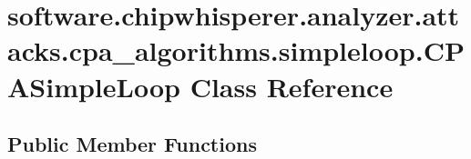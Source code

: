\hypertarget{classsoftware_1_1chipwhisperer_1_1analyzer_1_1attacks_1_1cpa__algorithms_1_1simpleloop_1_1CPASimpleLoop}{}\section{software.\+chipwhisperer.\+analyzer.\+attacks.\+cpa\+\_\+algorithms.\+simpleloop.\+C\+P\+A\+Simple\+Loop Class Reference}
\label{classsoftware_1_1chipwhisperer_1_1analyzer_1_1attacks_1_1cpa__algorithms_1_1simpleloop_1_1CPASimpleLoop}
\subsection*{Public Member Functions}
